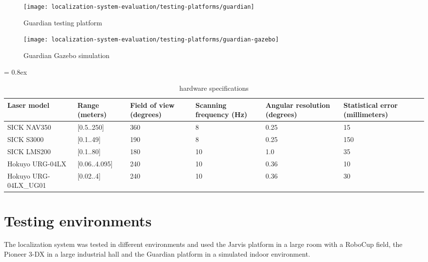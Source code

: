 \begin{figure}[H]
	\centering
	\begin{minipage}[h]{0.497\textwidth}
		\centering
		\texttt{[image: localization-system-evaluation/testing-platforms/guardian]}
		\caption{Guardian testing platform}
		\label{fig:localization-system-evaluation_guardian}
	\end{minipage}\hfill
	\begin{minipage}[h]{0.497\textwidth}
		\centering
		\texttt{[image: localization-system-evaluation/testing-platforms/guardian-gazebo]}
		\caption{Guardian Gazebo simulation}
		\label{fig:localization-system-evaluation_guardian_gazebo}
	\end{minipage}
\end{figure}


\begin{table}[H]
	\caption{ hardware specifications}
	\tabulinesep = 0.8ex
	\centering
	\small
	\begin{tabu} { X[2.5,m,c] | X[m,c] X[m,c] X[m,c] X[m,c] X[m,c] }
		\rowfont{\bfseries\itshape} Laser model & Range (meters) & Field of view (degrees) & Scanning frequency (Hz) & Angular resolution (degrees) & Statistical error (millimeters) \\
		\hline
		{\small SICK NAV350} 			& [0.5..250] 	& 360 	& 8 	& 0.25 	& 15 	\\
		{\small SICK S3000} 			& [0.1..49] 	& 190 	& 8 	& 0.25 	& 150 	\\
		{\small SICK LMS200} 			& [0.1..80] 	& 180 	& 10 	& 1.0 	& 35 	\\
		{\small Hokuyo URG-04LX} 		& [0.06..4.095] & 240 	& 10 	& 0.36 	& 10 	\\
		{\small Hokuyo URG-04LX\_UG01} 	& [0.02..4] 	& 240 	& 10 	& 0.36 	& 30 	\\
	\end{tabu}
	\label{tab:localization-system-evaluation_laser-hardware-specifications}
\end{table}


\section{Testing environments}

The localization system was tested in different environments and used the Jarvis platform in a large room with a RoboCup field, the Pioneer 3-DX in a large industrial hall and the Guardian platform in a simulated indoor environment.


